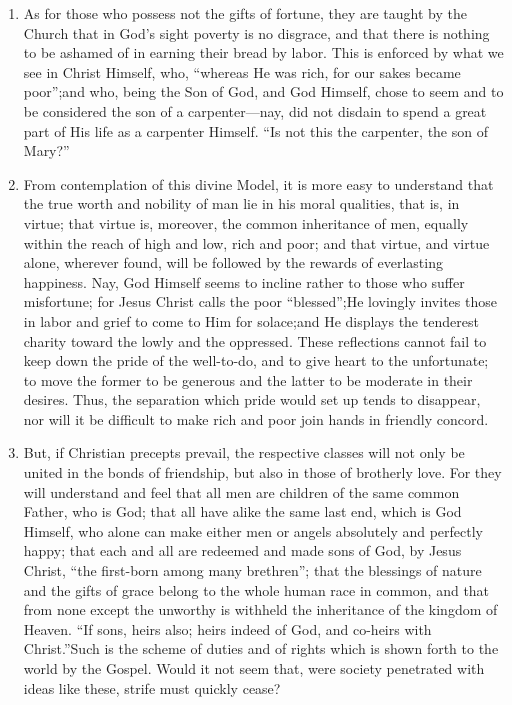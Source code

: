 \documentclass{book}
\begin{document}
\begin{enumerate}
	\item As for those who possess not the gifts of fortune, they are taught by the Church that in God’s sight poverty is no disgrace, and that there is nothing to be ashamed of in earning their bread by labor. This is enforced by what we see in Christ Himself, who, “whereas He was rich, for our sakes became poor”;\footnotemark[17] and who, being the Son of God, and God Himself, chose to seem and to be considered the son of a carpenter—nay, did not disdain to spend a great part of His life as a carpenter Himself. “Is not this the carpenter, the son of Mary?”\footnotemark[18]


	\item From contemplation of this divine Model, it is more easy to understand that the true worth and nobility of man lie in his moral qualities, that is, in virtue; that virtue is, moreover, the common inheritance of men, equally within the reach of high and low, rich and poor; and that virtue, and virtue alone, wherever found, will be followed by the rewards of everlasting happiness. Nay, God Himself seems to incline rather to those who suffer misfortune; for Jesus Christ calls the poor “blessed”;\footnotemark[19] He lovingly invites those in labor and grief to come to Him for solace;\footnotemark[20] and He displays the tenderest charity toward the lowly and the oppressed. These reflections cannot fail to keep down the pride of the well-to-do, and to give heart to the unfortunate; to move the former to be generous and the latter to be moderate in their desires. Thus, the separation which pride would set up tends to disappear, nor will it be difficult to make rich and poor join hands in friendly concord.


	\item But, if Christian precepts prevail, the respective classes will not only be united in the bonds of friendship, but also in those of brotherly love. For they will understand and feel that all men are children of the same common Father, who is God; that all have alike the same last end, which is God Himself, who alone can make either men or angels absolutely and perfectly happy; that each and all are redeemed and made sons of God, by Jesus Christ, “the first-born among many brethren”; that the blessings of nature and the gifts of grace belong to the whole human race in common, and that from none except the unworthy is withheld the inheritance of the kingdom of Heaven. “If sons, heirs also; heirs indeed of God, and co-heirs with Christ.”\footnotemark[21] Such is the scheme of duties and of rights which is shown forth to the world by the Gospel. Would it not seem that, were society penetrated with ideas like these, strife must quickly cease?



\end{enumerate}
\end{document}
